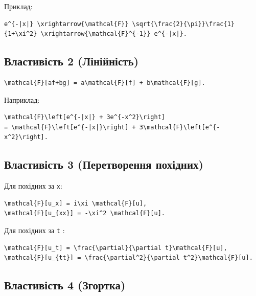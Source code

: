 \documentclass[
  ukrainian,
]{article}
\begin{document}
Приклад:

\begin{verbatim}
e^{-|x|} \xrightarrow{\mathcal{F}} \sqrt{\frac{2}{\pi}}\frac{1}{1+\xi^2} \xrightarrow{\mathcal{F}^{-1}} e^{-|x|}.
\end{verbatim}

\subsection{Властивість 2
(Лінійність)}\label{ux432ux43bux430ux441ux442ux438ux432ux456ux441ux442ux44c-2-ux43bux456ux43dux456ux439ux43dux456ux441ux442ux44c}

\begin{verbatim}
\mathcal{F}[af+bg] = a\mathcal{F}[f] + b\mathcal{F}[g].
\end{verbatim}

Наприклад:

\begin{verbatim}
\mathcal{F}\left[e^{-|x|} + 3e^{-x^2}\right]
= \mathcal{F}\left[e^{-|x|}\right] + 3\mathcal{F}\left[e^{-x^2}\right].
\end{verbatim}

\subsection{Властивість 3 (Перетворення
похідних)}\label{ux432ux43bux430ux441ux442ux438ux432ux456ux441ux442ux44c-3-ux43fux435ux440ux435ux442ux432ux43eux440ux435ux43dux43dux44f-ux43fux43eux445ux456ux434ux43dux438ux445}

Для похідних за \texttt{x}:

\begin{verbatim}
\mathcal{F}[u_x] = i\xi \mathcal{F}[u],
\mathcal{F}[u_{xx}] = -\xi^2 \mathcal{F}[u].
\end{verbatim}

Для похідних за \texttt{t} :

\begin{verbatim}
\mathcal{F}[u_t] = \frac{\partial}{\partial t}\mathcal{F}[u],
\mathcal{F}[u_{tt}] = \frac{\partial^2}{\partial t^2}\mathcal{F}[u].
\end{verbatim}

\subsection{Властивість 4
(Згортка)}\label{ux432ux43bux430ux441ux442ux438ux432ux456ux441ux442ux44c-4-ux437ux433ux43eux440ux442ux43aux430}
\end{document}
